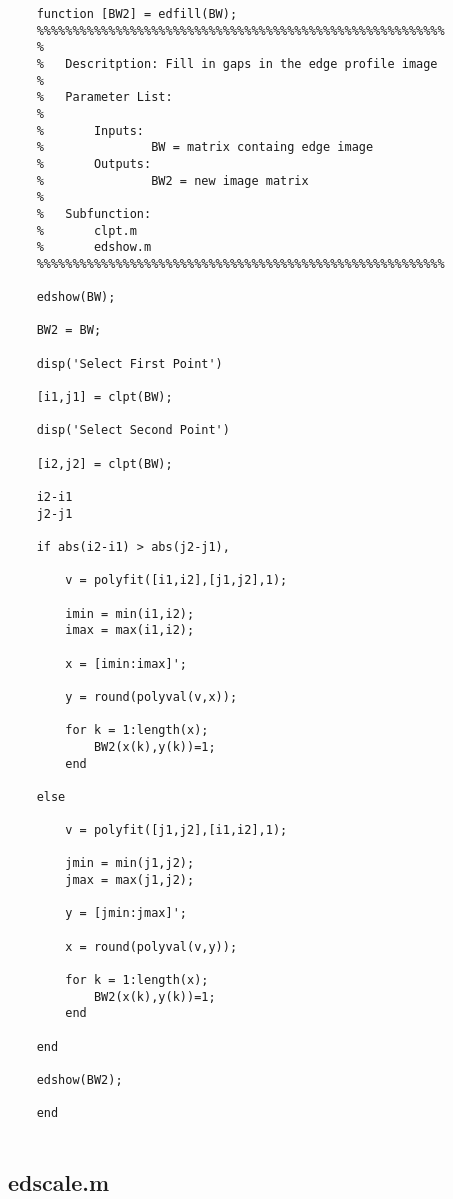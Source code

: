 \begin{lstlisting}
	function [BW2] = edfill(BW);
	%%%%%%%%%%%%%%%%%%%%%%%%%%%%%%%%%%%%%%%%%%%%%%%%%%%%%%%%%
	%
	%	Descritption: Fill in gaps in the edge profile image
	%
	%	Parameter List:
	%
	%		Inputs:
	%				BW = matrix containg edge image
	%		Outputs:
	%				BW2 = new image matrix
	%
	%	Subfunction:
	%		clpt.m
	%		edshow.m
	%%%%%%%%%%%%%%%%%%%%%%%%%%%%%%%%%%%%%%%%%%%%%%%%%%%%%%%%%
	
	edshow(BW);
	
	BW2 = BW;
	
	disp('Select First Point')
	
	[i1,j1] = clpt(BW);
	
	disp('Select Second Point')
	
	[i2,j2] = clpt(BW);
	
	i2-i1
	j2-j1
	
	if abs(i2-i1) > abs(j2-j1),
	
		v = polyfit([i1,i2],[j1,j2],1);
		
		imin = min(i1,i2);
		imax = max(i1,i2);
		
		x = [imin:imax]';
		
		y = round(polyval(v,x));
		
		for k = 1:length(x);
			BW2(x(k),y(k))=1;
		end
		
	else
	
		v = polyfit([j1,j2],[i1,i2],1);
		
		jmin = min(j1,j2);
		jmax = max(j1,j2);
		
		y = [jmin:jmax]';
		
		x = round(polyval(v,y));
		
		for k = 1:length(x);
			BW2(x(k),y(k))=1;
		end
		
	end
	
	edshow(BW2);
	
	end
	
\end{lstlisting}

\newpage

\subsection{edscale.m}

